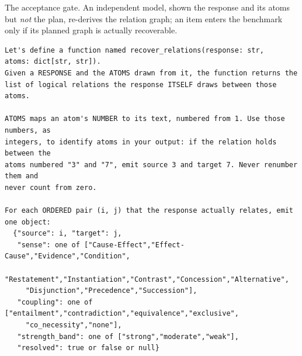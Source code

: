 \documentclass[11pt]{article}
\begin{document}
The acceptance gate. An independent model, shown the response and its atoms but \emph{not} the
plan, re-derives the relation graph; an item enters the benchmark only if its planned graph is
actually recoverable.

\begin{small}
\begin{verbatim}
Let's define a function named recover_relations(response: str,
atoms: dict[str, str]).
Given a RESPONSE and the ATOMS drawn from it, the function returns the
list of logical relations the response ITSELF draws between those atoms.

ATOMS maps an atom's NUMBER to its text, numbered from 1. Use those numbers, as
integers, to identify atoms in your output: if the relation holds between the
atoms numbered "3" and "7", emit source 3 and target 7. Never renumber them and
never count from zero.

For each ORDERED pair (i, j) that the response actually relates, emit one object:
  {"source": i, "target": j,
   "sense": one of ["Cause-Effect","Effect-Cause","Evidence","Condition",
     "Restatement","Instantiation","Contrast","Concession","Alternative",
     "Disjunction","Precedence","Succession"],
   "coupling": one of ["entailment","contradiction","equivalence","exclusive",
     "co_necessity","none"],
   "strength_band": one of ["strong","moderate","weak"],
   "resolved": true or false or null}


\end{verbatim}
\end{small}
\end{document}
